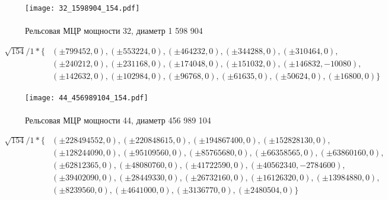 \documentclass[10pt,pdf,hyperref={unicode},aspectratio=169]{beamer}
\theoremstyle{definition}
\begin{document}
\begin{frame}

    \begin{figure}[h!]
    	\centering
    	\texttt{[image: 32\_1598904\_154.pdf]}
    	\\~\\{Рельсовая МЦР мощности 32, диаметр 1 598 904}
    \end{figure}

    \begin{align*}
    	\sqrt{154}/1 * \{
		&
    	(\pm 799452, 0),
    	(\pm 553224, 0),
    	(\pm 464232, 0),
    	(\pm 344288, 0),
    	(\pm 310464, 0), \\
    	&(\pm 240212, 0),
    	(\pm 231168, 0),
    	(\pm 174048, 0),
    	(\pm 151032, 0),
    	(\pm 146832, -10080), \\
    	&(\pm 142632, 0),
    	(\pm 102984, 0),
    	(\pm 96768, 0),
    	(\pm 61635, 0),
    	(\pm 50624, 0),
    	(\pm 16800, 0)
    	\}
    \end{align*}

\end{frame}

\begin{frame}

    \begin{figure}[h!]
    	\centering
    	\texttt{[image: 44\_456989104\_154.pdf]}
    	\\~\\{Рельсовая МЦР мощности 44, диаметр 456 989 104}
    \end{figure}

    \begin{align*}
    	\sqrt{154}/1 * \{
		&
    	(\pm 228494552, 0),
    	(\pm 220848615, 0),
    	(\pm 194867400, 0),
    	(\pm 152828130, 0), \\
    	&(\pm 128244090, 0),
    	(\pm 95109560, 0),
    	(\pm 85765680, 0),
    	(\pm 66358565, 0),
    	(\pm 63860160, 0), \\
    	&(\pm 62812365, 0),
    	(\pm 48080760, 0),
    	(\pm 41722590, 0),
    	(\pm 40562340, -2784600),
		\\&
    	(\pm 39402090, 0),
    	(\pm 28449330, 0),
    	(\pm 26732160, 0),
    	(\pm 16126320, 0),
    	(\pm 13984880, 0),
		\\&
    	(\pm 8239560, 0),
    	(\pm 4641000, 0),
    	(\pm 3136770, 0),
    	(\pm 2480504, 0)
    	\}
    \end{align*}

\end{frame}
\end{document}

